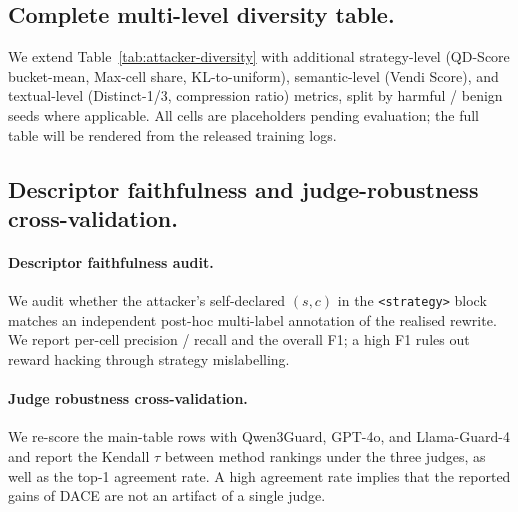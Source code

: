 \documentclass{article}
\newcommand{\method}{\textsc{DACE}\xspace}
\begin{document}
\subsection{Complete multi-level diversity table.}
\label{apdx:bench-diversity-full}

We extend Table~\ref{tab:attacker-diversity} with additional strategy-level (QD-Score bucket-mean, Max-cell share, KL-to-uniform), semantic-level (Vendi Score), and textual-level (Distinct-1/3, compression ratio) metrics, split by harmful / benign seeds where applicable. All cells are placeholders pending evaluation; the full table will be rendered from the released training logs.

\subsection{Descriptor faithfulness and judge-robustness cross-validation.}
\label{apdx:bench-audit}

\paragraph{Descriptor faithfulness audit.} We audit whether the attacker's self-declared $(s, c)$ in the \texttt{<strategy>} block matches an independent post-hoc multi-label annotation of the realised rewrite. We report per-cell precision / recall and the overall F1; a high F1 rules out reward hacking through strategy mislabelling.

\paragraph{Judge robustness cross-validation.} We re-score the main-table rows with Qwen3Guard, GPT-4o, and Llama-Guard-4 and report the Kendall $\tau$ between method rankings under the three judges, as well as the top-1 agreement rate. A high agreement rate implies that the reported gains of \method are not an artifact of a single judge.
\end{document}
